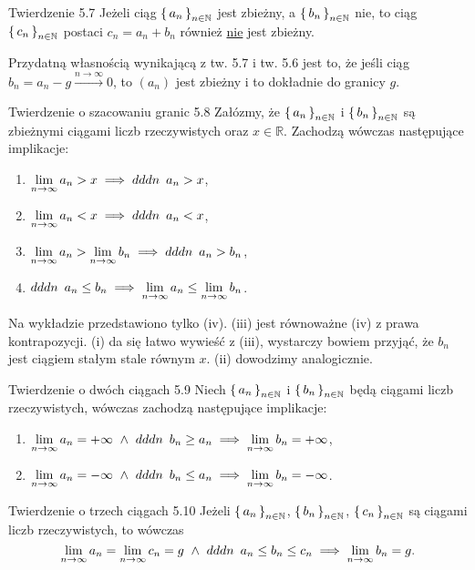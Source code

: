 \documentclass{article}
\newcommand{\hquad}{\mkern9mu}
\newcommand{\R}{\mathbb{R}}
\newcommand{\N}{\mathbb{N}}
\newcommand{\lin}[1]{\lim\limits_{n\to\infty}{#1}}
\newcommand{\arn}{\xrightarrow{n\to\infty}}
\newcommand{\seq}[1]{\set{#1_n}_{n\in\N}}
\begin{document}
\begin{twier}{Twierdzenie 5.7}
    Jeżeli ciąg $\seq{a}$ jest zbieżny, a $\seq{b}$ nie, to
    ciąg $\seq{c}$ postaci $c_n=a_n+b_n$ również \underline{nie} jest zbieżny.
\end{twier}

Przydatną własnością wynikającą z tw. 5.7 i tw. 5.6 jest to, że jeśli ciąg $b_n=a_n-g\arn 0$, to $(a_n)$ jest zbieżny i to
dokładnie do granicy $g$.

\begin{twier}{Twierdzenie o szacowaniu granic 5.8}
Załózmy, że $\seq{a}$ i $\seq{b}$ są zbieżnymi ciągami liczb rzeczywistych
oraz $x\in\R$. Zachodzą wówczas następujące implikacje:
\begin{enumerate}[label=(\roman*)]
    \item $\lim\limits_{n\to\infty}{a_n}>x\implies dddn\hquad a_n>x$,
    \item $\lim\limits_{n\to\infty}{a_n}<x\implies dddn\hquad a_n<x$,
    \item $\lim\limits_{n\to\infty}{a_n}>\lim\limits_{n\to\infty}{b_n}\implies dddn\hquad a_n>b_n$,
    \item $dddn\hquad a_n\le b_n\implies \lim\limits_{n\to\infty}{a_n}\le\lim\limits_{n\to\infty}{b_n}$.
\end{enumerate}
\end{twier}

Na wykładzie przedstawiono tylko (iv). (iii) jest równoważne (iv) z prawa kontrapozycji. (i) da się łatwo wywieść z (iii),
wystarczy bowiem przyjąć, że $b_n$ jest ciągiem stałym stale równym $x$. (ii) dowodzimy analogicznie.

\begin{twier}{Twierdzenie o dwóch ciągach 5.9}
Niech $\seq{a}$ i $\seq{b}$ będą ciągami liczb rzeczywistych, wówczas zachodzą następujące implikacje:
\begin{enumerate}[label=\Roman*.]
    \item $\lin{a_n}=+\infty\ \land\ dddn\hquad b_n\ge a_n\implies \lin{b_n}=+\infty$,
    \item $\lin{a_n}=-\infty\ \land\ dddn\hquad b_n\le a_n\implies \lin{b_n}=-\infty$.
\end{enumerate}
\end{twier}

\begin{twier}{Twierdzenie o trzech ciągach 5.10}
Jeżeli $\seq{a}$, $\seq{b}$, $\seq{c}$ są ciągami liczb rzeczywistych, to wówczas
\begin{equation*}
    \lin{a_n}=\lin{c_n}=g\ \land\ dddn\hquad a_n\le b_n\le c_n\implies \lin{b_n}=g.
\end{equation*}
\end{twier}
\end{document}
